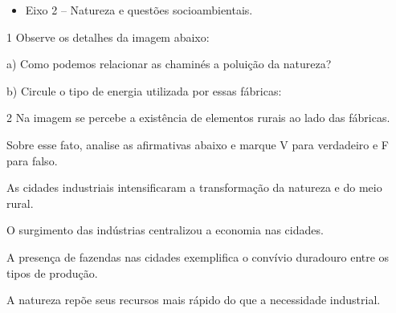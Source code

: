 
\begin{itemize}
\item Eixo 2 -- Natureza e questões socioambientais.
\end{itemize}

\num{1} Observe os detalhes da imagem abaixo:

%


\num{a)} Como podemos relacionar as chaminés a poluição da natureza?

\linhas[3]


\num{b)} Circule o tipo de energia utilizada por essas fábricas:

\begin{multicols}{2}




\end{multicols}


\num{2} Na imagem se percebe a existência de elementos rurais ao lado das fábricas.

Sobre esse fato, analise as afirmativas abaixo e marque V para verdadeiro e F para falso.

\begin{boxlist}
\item As cidades industriais intensificaram a transformação da natureza e
do meio rural. 

\item O surgimento das indústrias centralizou a economia nas cidades. 

\item A presença de fazendas nas cidades exemplifica o convívio duradouro
entre os tipos de produção. 

\item A natureza repõe seus recursos mais rápido do que a necessidade
industrial. 
\end{boxlist}

